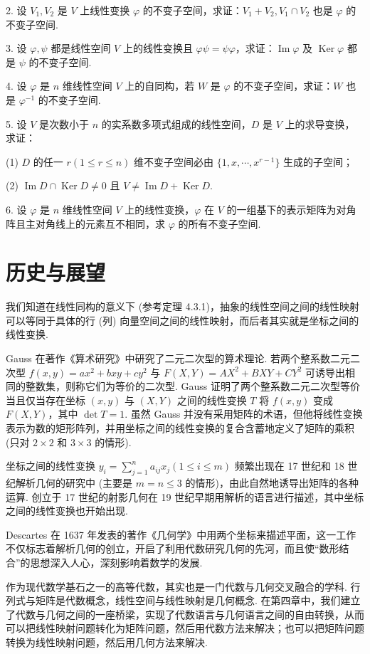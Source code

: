 \documentclass[UTF8, 12pt, fontset=fandol, oneside]{ctexart}
\begin{document}
2. 设 $V_1,V_2$ 是 $V$ 上线性变换 $\varphi$ 的不变子空间，求证：$V_1+V_2,V_1\cap V_2$ 也是 $\varphi$ 的不变子空间.

3. 设 $\varphi,\psi$ 都是线性空间 $V$ 上的线性变换且 $\varphi\psi=\psi\varphi$，求证：$\operatorname{Im}\varphi$ 及 $\operatorname{Ker}\varphi$ 都是 $\psi$ 的不变子空间.

4. 设 $\varphi$ 是 $n$ 维线性空间 $V$ 上的自同构，若 $W$ 是 $\varphi$ 的不变子空间，求证：$W$ 也是 $\varphi^{-1}$ 的不变子空间.

5. 设 $V$ 是次数小于 $n$ 的实系数多项式组成的线性空间，$D$ 是 $V$ 上的求导变换，求证：

(1) $D$ 的任一 $r(1\leq r\leq n)$ 维不变子空间必由 $\{1,x,\cdots,x^{r-1}\}$ 生成的子空间；

(2) $\operatorname{Im}D\cap\operatorname{Ker}D\neq 0$ 且 $V\neq\operatorname{Im}D+\operatorname{Ker}D$.

6. 设 $\varphi$ 是 $n$ 维线性空间 $V$ 上的线性变换，$\varphi$ 在 $V$ 的一组基下的表示矩阵为对角阵且主对角线上的元素互不相同，求 $\varphi$ 的所有不变子空间.

\section*{历史与展望}

我们知道在线性同构的意义下 (参考定理 4.3.1)，抽象的线性空间之间的线性映射可以等同于具体的行 (列) 向量空间之间的线性映射，而后者其实就是坐标之间的线性变换.

Gauss 在著作《算术研究》中研究了二元二次型的算术理论. 若两个整系数二元二次型 $f(x,y)=ax^2+bxy+cy^2$ 与 $F(X,Y)=AX^2+BXY+CY^2$ 可诱导出相同的整数集，则称它们为等价的二次型. Gauss 证明了两个整系数二元二次型等价当且仅当存在坐标 $(x,y)$ 与 $(X,Y)$ 之间的线性变换 $T$ 将 $f(x,y)$ 变成 $F(X,Y)$，其中 $\det T=1$. 虽然 Gauss 并没有采用矩阵的术语，但他将线性变换表示为数的矩形阵列，并用坐标之间的线性变换的复合含蓄地定义了矩阵的乘积 (只对 $2\times 2$ 和 $3\times 3$ 的情形).

坐标之间的线性变换 $y_i=\sum_{j=1}^n a_{ij}x_j(1\leq i\leq m)$ 频繁出现在 17 世纪和 18 世纪解析几何的研究中 (主要是 $m=n\leq 3$ 的情形)，由此自然地诱导出矩阵的各种运算. 创立于 17 世纪的射影几何在 19 世纪早期用解析的语言进行描述，其中坐标之间的线性变换也开始出现.

Descartes 在 1637 年发表的著作《几何学》中用两个坐标来描述平面，这一工作不仅标志着解析几何的创立，开启了利用代数研究几何的先河，而且使“数形结合”的思想深入人心，深刻影响着数学的发展.

作为现代数学基石之一的高等代数，其实也是一门代数与几何交叉融合的学科. 行列式与矩阵是代数概念，线性空间与线性映射是几何概念. 在第四章中，我们建立了代数与几何之间的一座桥梁，实现了代数语言与几何语言之间的自由转换，从而可以把线性映射问题转化为矩阵问题，然后用代数方法来解决；也可以把矩阵问题转换为线性映射问题，然后用几何方法来解决.
\end{document}
